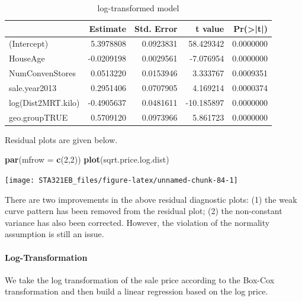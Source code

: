 \documentclass[
]{book}
\newenvironment{Shaded}{\begin{snugshade}}{\end{snugshade}}
\newcommand{\AttributeTok}[1]{\textcolor[rgb]{0.13,0.29,0.53}{#1}}
\newcommand{\DecValTok}[1]{\textcolor[rgb]{0.00,0.00,0.81}{#1}}
\newcommand{\FunctionTok}[1]{\textcolor[rgb]{0.13,0.29,0.53}{\textbf{#1}}}
\newcommand{\NormalTok}[1]{#1}
\begin{document}
\begin{table}

\caption{\label{tab:unnamed-chunk-83}log-transformed model}
\centering
\begin{tabular}[t]{l|r|r|r|r}
\hline
  & Estimate & Std. Error & t value & Pr(>|t|)\\
\hline
(Intercept) & 5.3978808 & 0.0923831 & 58.429342 & 0.0000000\\
\hline
HouseAge & -0.0209198 & 0.0029561 & -7.076954 & 0.0000000\\
\hline
NumConvenStores & 0.0513220 & 0.0153946 & 3.333767 & 0.0009351\\
\hline
sale.year2013 & 0.2951406 & 0.0707905 & 4.169214 & 0.0000374\\
\hline
log(Dist2MRT.kilo) & -0.4905637 & 0.0481611 & -10.185897 & 0.0000000\\
\hline
geo.groupTRUE & 0.5709120 & 0.0973966 & 5.861723 & 0.0000000\\
\hline
\end{tabular}
\end{table}

Residual plots are given below.

\begin{Shaded}
\begin{Highlighting}[]
\FunctionTok{par}\NormalTok{(}\AttributeTok{mfrow =} \FunctionTok{c}\NormalTok{(}\DecValTok{2}\NormalTok{,}\DecValTok{2}\NormalTok{))}
\FunctionTok{plot}\NormalTok{(sqrt.price.log.dist)}
\end{Highlighting}
\end{Shaded}

\begin{center}\texttt{[image: STA321EB\_files/figure-latex/unnamed-chunk-84-1]} \end{center}

There are two improvements in the above residual diagnostic plots: (1) the weak curve pattern has been removed from the residual plot; (2) the non-constant variance has also been corrected. However, the violation of the normality assumption is still an issue.

\hypertarget{log-transformation}{%
\paragraph{Log-Transformation}\label{log-transformation}}

We take the log transformation of the sale price according to the Box-Cox transformation and then build a linear regression based on the log price.
\end{document}
